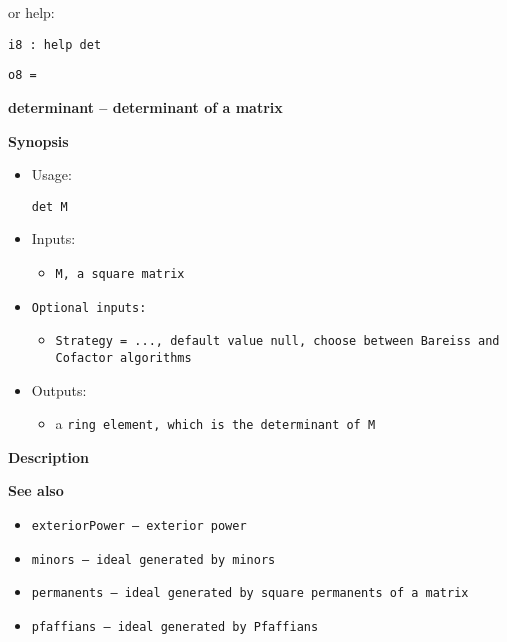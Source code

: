 \documentclass[12pt,a4paper]{amsart}
\begin{document}
or help:
\smallskip
\begin{verbatim}
i8 : help det
\end{verbatim}
\verb|o8 = |
\par \medskip\noindent\begingroup\Large\bf
determinant -- determinant of a matrix\endgroup
\par \smallskip%

\par \medskip\noindent\begingroup\Large\bf
Synopsis\endgroup
\par \smallskip%
\begin{itemize}
\item 
\par Usage: 
\par \begingroup\tt det\ M\endgroup{}
\item Inputs:\begin{itemize}
\item \begingroup\tt M\endgroup{}, a square \begingroup\tt matrix\endgroup{}
\end{itemize}

\item \begingroup\tt Optional\ inputs\endgroup{}:\begin{itemize}
\item \begingroup\tt Strategy\endgroup{}\begingroup\tt \ ={}\ \endgroup{}\begingroup\tt ...\endgroup{}, default value null, choose between Bareiss and Cofactor algorithms
\end{itemize}

\item Outputs:\begin{itemize}
\item a \begingroup\tt ring\ element\endgroup{}, which is the determinant of \begingroup\tt M\endgroup{}
\end{itemize}

\end{itemize}

\par \medskip\noindent\begingroup\Large\bf
Description\endgroup
\par \smallskip%

\par \medskip\noindent\begingroup\Large\bf
See also\endgroup
\par \smallskip%
\begin{itemize}
\item \begingroup\tt exteriorPower\endgroup{} -- exterior power
\item \begingroup\tt minors\endgroup{} -- ideal generated by minors
\item \begingroup\tt permanents\endgroup{} -- ideal generated by square permanents of a matrix
\item \begingroup\tt pfaffians\endgroup{} -- ideal generated by Pfaffians
\end{itemize}
\end{document}
